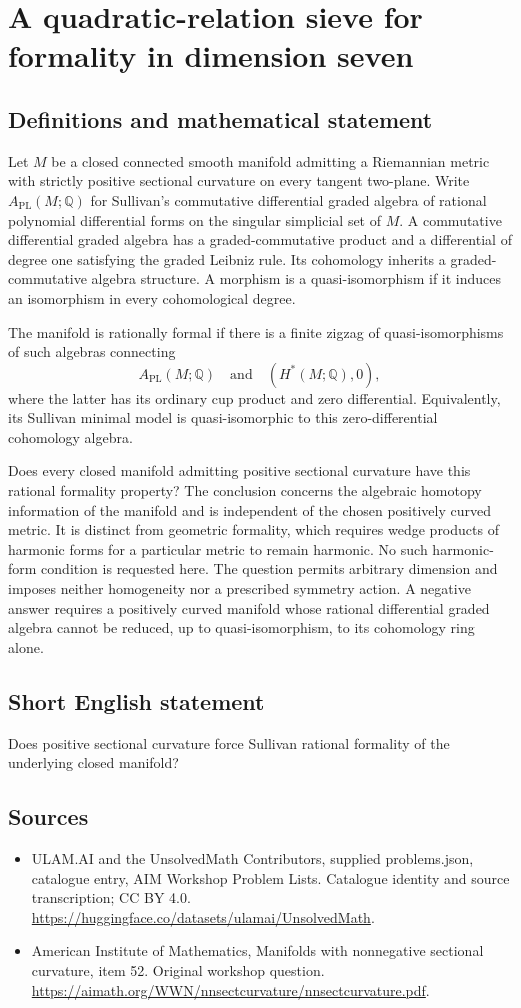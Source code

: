 \documentclass[11pt,a4paper]{article}
\begin{document}
\section*{A quadratic-relation sieve for formality in dimension seven}\label{statement}

\subsection{Definitions and mathematical statement}
Let $M$ be a closed connected smooth manifold admitting a Riemannian metric with strictly positive sectional curvature on every tangent two-plane.
Write $A_{\mathrm{PL}}(M;\mathbb Q)$ for Sullivan's commutative differential graded algebra of rational polynomial differential forms on the singular simplicial set of $M$.
A commutative differential graded algebra has a graded-commutative product and a differential of degree one satisfying the graded Leibniz rule.
Its cohomology inherits a graded-commutative algebra structure.
A morphism is a quasi-isomorphism if it induces an isomorphism in every cohomological degree.

The manifold is rationally formal if there is a finite zigzag of quasi-isomorphisms of such algebras connecting
\[
 A_{\mathrm{PL}}(M;\mathbb Q)
 \quad\text{and}\quad
 (H^*(M;\mathbb Q),0),
\]
where the latter has its ordinary cup product and zero differential.
Equivalently, its Sullivan minimal model is quasi-isomorphic to this zero-differential cohomology algebra.

Does every closed manifold admitting positive sectional curvature have this rational formality property?
The conclusion concerns the algebraic homotopy information of the manifold and is independent of the chosen positively curved metric.
It is distinct from geometric formality, which requires wedge products of harmonic forms for a particular metric to remain harmonic.
No such harmonic-form condition is requested here.
The question permits arbitrary dimension and imposes neither homogeneity nor a prescribed symmetry action.
A negative answer requires a positively curved manifold whose rational differential graded algebra cannot be reduced, up to quasi-isomorphism, to its cohomology ring alone.
\subsection{Short English statement}
Does positive sectional curvature force Sullivan rational formality of the underlying closed manifold?
\subsection{Sources}
\begin{itemize}
\item[S1] ULAM.AI and the UnsolvedMath Contributors, supplied problems.json, catalogue entry, AIM Workshop Problem Lists. Catalogue identity and source transcription; CC BY 4.0.
\url{https://huggingface.co/datasets/ulamai/UnsolvedMath}.
\item[S2] American Institute of Mathematics, Manifolds with nonnegative sectional curvature, item 52. Original workshop question.
\url{https://aimath.org/WWN/nnsectcurvature/nnsectcurvature.pdf}.
\end{itemize}
\end{document}

